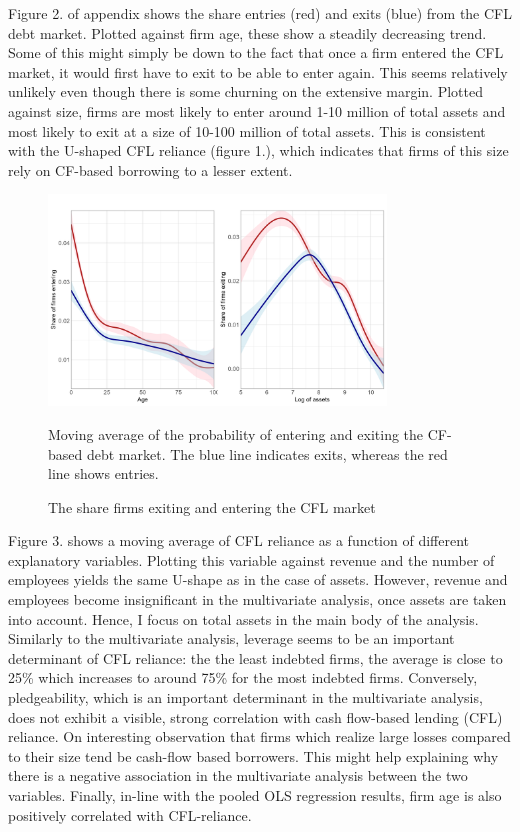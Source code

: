 \documentclass[12pt]{article}
\begin{document}
\noindent Figure 2. of appendix shows the share entries (red) and exits (blue) from the CFL debt market. Plotted against firm age, these show a steadily decreasing trend. Some of this might simply be down to the fact that once a firm entered the CFL market, it would first have to exit to be able to enter again. This seems relatively unlikely even though there is some churning on the extensive margin. Plotted against size, firms are most likely to enter around 1-10 million of total assets and most likely to exit at a size of 10-100 million of total assets. This is consistent with the U-shaped CFL reliance (figure 1.), which indicates that firms of this size rely on CF-based borrowing to a lesser extent. 

\begin{figure}[H]  %
    \centering
    \caption{The share firms exiting and entering the CFL market}\label{chart:exitenter}
    \includegraphics[width=0.8\textwidth]{exit_entry.png} 
    
     \small Moving average of the probability of entering and exiting the CF-based debt market. The blue line indicates exits, whereas the red line shows entries.
\end{figure}

\noindent Figure 3. shows a moving average of CFL reliance as a function  of different explanatory variables. Plotting this variable against revenue and the number of employees yields the same U-shape as in the case of assets. However, revenue and employees become insignificant in the multivariate analysis, once assets are taken into account. Hence, I focus on total assets in the main body of the analysis. Similarly to the multivariate analysis, leverage seems to be an important determinant of CFL reliance: the the least indebted firms, the average is close to 25\% which increases to around 75\% for the most indebted firms. Conversely, pledgeability, which is an important determinant in the multivariate analysis, does not exhibit a visible, strong correlation with cash flow-based lending (CFL) reliance. On interesting observation that firms which realize large losses compared to their size tend be cash-flow based borrowers. This might help explaining why there is a negative association in the multivariate analysis between the two variables. Finally, in-line with the pooled OLS regression results, firm age is also positively correlated with CFL-reliance.
\end{document}
